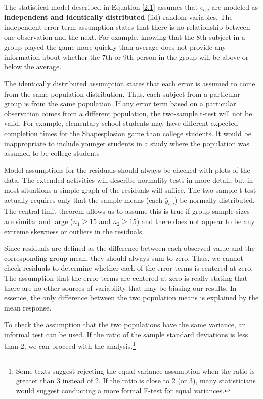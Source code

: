 \documentclass[
]{report}
\begin{document}
The statistical model described in Equation \ref{2.1} assumes that \(\epsilon_{i, j}\) are modeled as \textbf{independent and identically distributed} (iid) random variables. The independent error term assumption states that there is no relationship between one observation and the next. For example, knowing that the 8th subject in a group played the game more quickly than average does not provide any information about whether the 7th or 9th person in the group will be above or below the average.

The identically distributed assumption states that each error is assumed to come from the same population distribution. Thus, each subject from a particular group is from the same population. If any error term
based on a particular observation comes from a different population, the two-sample t-test will not be valid. For example, elementary school students may have different expected completion times for the Shapesplosion game than college students. It would be inappropriate to include younger students in a study where the population was assumed to be college students

Model assumptions for the residuals should always be checked with plots of the data. The extended activities will describe normality tests in more detail, but in most situations a simple graph of the residuals will
suffice. The two sample t-test actually requires only that the sample means (each \(\bar{y}_{i,j}\)) be normally distributed. The central limit theorem allows us to assume this is true if group sample sizes are similar and large (\(n_1 \ge 15\) and \(n_2 \ge 15\)) and there does not appear to be any extreme skewness or outliers in the residuals.

Since residuals are defined as the difference between each observed value and the corresponding group mean, they should always sum to zero. Thus, we cannot check residuals to determine whether each of the error
terms is centered at zero. The assumption that the error terms are centered at zero is really stating that there are no other sources of variability that may be biasing our results. In essence, the only difference between the two population means is explained by the mean response.

To check the assumption that the two populations have the same variance, an informal test can be used. If the ratio of the sample standard deviations is less than 2, we can proceed with the analysis.\footnote{Some texts suggest rejecting the equal variance assumption when the ratio is greater than 3 instead of 2. If the ratio is close to 2 (or 3), many statisticians would suggest conducting a more formal F-test for equal variances.}
\end{document}
